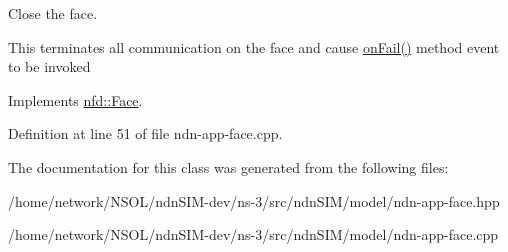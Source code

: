 Close the face. 

This terminates all communication on the face and cause \hyperlink{classnfd_1_1Face_a0f6ac85e5c965d24290f87562022123f}{on\+Fail()} method event to be invoked 

Implements \hyperlink{classnfd_1_1Face_a63f2c417cde23bf09441927951ef86d3}{nfd\+::\+Face}.



Definition at line 51 of file ndn-\/app-\/face.\+cpp.



The documentation for this class was generated from the following files\+:\begin{DoxyCompactItemize}
\item 
/home/network/\+N\+S\+O\+L/ndn\+S\+I\+M-\/dev/ns-\/3/src/ndn\+S\+I\+M/model/ndn-\/app-\/face.\+hpp\item 
/home/network/\+N\+S\+O\+L/ndn\+S\+I\+M-\/dev/ns-\/3/src/ndn\+S\+I\+M/model/ndn-\/app-\/face.\+cpp\end{DoxyCompactItemize}
